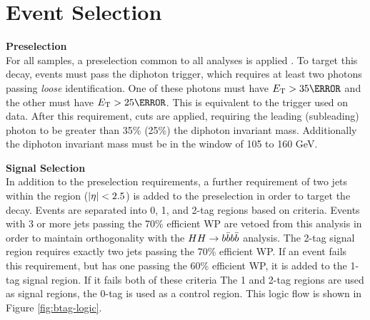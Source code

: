 \section{Event Selection} \label{sec:yybb-event-selection}
\noindent\textbf{Preselection}\\
\indent For all samples, a preselection common to all \Hgg analyses is applied \cite{hgam-preselection}. To target this decay, events must pass the diphoton trigger, which requires at least two photons passing \textit{loose} identification. One of these photons must have $\et > \unit{35}{\GeV}$ and the other must have $\et > \unit{25}{\GeV}$. This is equivalent to the  trigger used on data. After this requirement, \pt cuts are applied, requiring the leading (subleading) photon \pt to be greater than 35\% (25\%) the diphoton invariant mass. Additionally the diphoton invariant mass must be in the window of 105 to 160 GeV.

\noindent\textbf{Signal Selection}\\
\indent In addition to the preselection requirements, a further requirement of two jets within the \btagging region ($|\eta| <2.5$) is added to the preselection in order to target the \Hbb decay. Events are separated into 0, 1, and 2-tag regions based on \btagging criteria. Events with 3 or more jets passing the 70\% efficient \btagging \gls{WP} are vetoed from this analysis in order to maintain orthogonality with the $HH \rightarrow b\bar{b} b\bar{b}$ analysis. The 2-tag signal region requires exactly two jets passing the 70\% efficient \btagging \gls{WP}. If an event fails this requirement, but has one \bjet passing the 60\% efficient \btagging \gls{WP}, it is added to the 1-tag signal region. If it fails both of these criteria The 1 and 2-tag regions are used as signal regions, the 0-tag is used as a control region. This logic flow is shown in Figure \ref{fig:btag-logic}.


